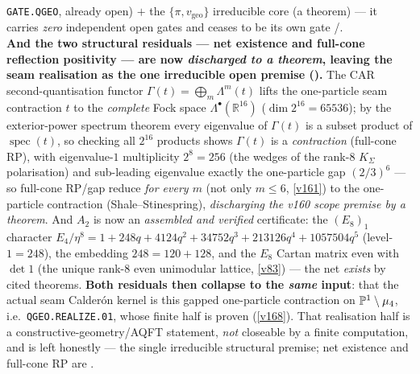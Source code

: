 \begin{keybox}
\texttt{GATE.QGEO}, already open) $+$ the $\{\pi,v_{\mathrm{geo}}\}$ irreducible core (a theorem) --- it
carries \emph{zero} independent open gates and ceases to be its own gate \mE/\mO.
\smallskip\\
\noindent\textbf{And the two structural residuals --- net existence and full-cone reflection positivity ---
are now \emph{discharged to a theorem}, leaving the seam realisation as the one irreducible open premise
().} The CAR second-quantisation functor
$\Gamma(t){=}\bigoplus_m\Lambda^m(t)$ lifts the one-particle seam contraction $t$ to the \emph{complete}
Fock space $\Lambda^\bullet(\mathbb R^{16})$ ($\dim 2^{16}{=}65536$); by the exterior-power spectrum theorem
every eigenvalue of $\Gamma(t)$ is a subset product of $\operatorname{spec}(t)$, so checking all $2^{16}$
products shows $\Gamma(t)$ is a \emph{contraction} (full-cone RP), with eigenvalue-$1$ multiplicity
$2^8{=}256$ (the wedges of the rank-$8$ $K_\Sigma$ polarisation) and sub-leading eigenvalue exactly the
one-particle gap $(2/3)^6$ --- so full-cone RP/gap reduce \emph{for every $m$} (not only $m\le6$, \vref{v161})
to the one-particle contraction (Shale--Stinespring), \emph{discharging the v160 scope premise by a theorem}.
And $A_2$ is now an \emph{assembled and verified} certificate: the $(E_8)_1$ character
$E_4/\eta^8{=}1{+}248q{+}4124q^2{+}34752q^3{+}213126q^4{+}1057504q^5$ (level-$1{=}248$), the embedding
$248{=}120{+}128$, and the $E_8$ Cartan matrix even with $\det 1$ (the unique rank-$8$ even unimodular
lattice, \vref{v83}) --- the net \emph{exists} by cited theorems. \textbf{Both residuals then collapse to the
\emph{same} input}: that the actual seam Calder\'on kernel is this gapped one-particle contraction on
$\mathbb P^1\setminus\mu_4$, i.e.\ \texttt{QGEO.REALIZE.01}, whose finite half is proven (\vref{v168}). That
realisation half is a constructive-geometry/AQFT statement, \emph{not} closeable by a finite computation, and
is left honestly \mO --- the single irreducible structural premise; net existence and full-cone RP are \mE.
\end{keybox}

